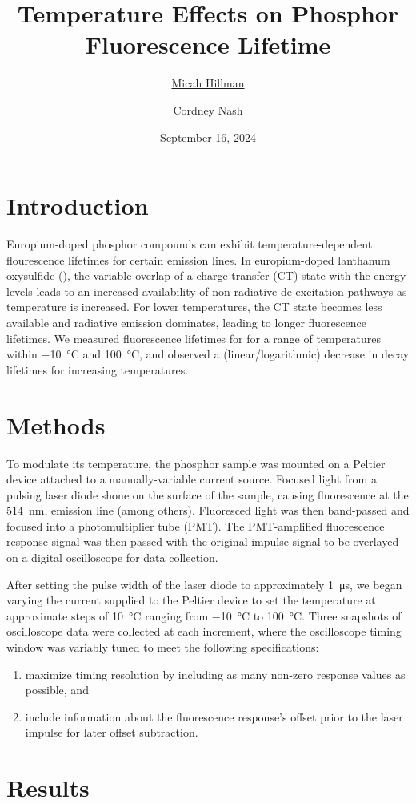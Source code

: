 \documentclass[12pt]{article}
\title{Temperature Effects on Phosphor Fluorescence Lifetime}
\date{September 16, 2024}
\author{\ul{Micah Hillman} \and Cordney Nash}
\begin{document}
  \maketitle

  \section*{Introduction}{
    Europium-doped phosphor compounds can exhibit temperature-dependent flourescence lifetimes for certain emission lines. In europium-doped lanthanum oxysulfide (), the variable overlap of a charge-transfer (CT) state with the  energy levels leads to an increased availability of non-radiative de-excitation pathways as temperature is increased. For lower temperatures, the CT state becomes less available and radiative emission dominates, leading to longer fluorescence lifetimes. We measured fluorescence lifetimes for  for a range of temperatures within \SI{-10}{\degreeCelsius} and \SI{100}{\degreeCelsius}, and observed a (linear/logarithmic) decrease in decay lifetimes for increasing temperatures.
  }

  \section*{Methods}{
    To modulate its temperature, the phosphor sample was mounted on a Peltier device attached to a manually-variable current source. Focused light from a pulsing laser diode shone on the surface of the sample, causing fluorescence at the \SI{514}{\nm},  emission line (among others). Fluoresced light was then band-passed and focused into a photomultiplier tube (PMT). The PMT-amplified fluorescence response signal was then passed with the original impulse signal to be overlayed on a digital oscilloscope for data collection.
    
    After setting the pulse width of the laser diode to approximately \SI{1}{\micro\second}, we began varying the current supplied to the Peltier device to set the temperature at approximate steps of \SI{10}{\degreeCelsius} ranging from \SI{-10}{\degreeCelsius} to \SI{100}{\degreeCelsius}. Three snapshots of oscilloscope data were collected at each increment, where the oscilloscope timing window was variably tuned to meet the following specifications:
      \begin{enumerate}
        \item maximize timing resolution by including as many non-zero response values as possible, and
        \item include information about the fluorescence response's offset prior to the laser impulse for later offset subtraction.
      \end{enumerate}
    
    

  }

  \section*{Results}{
    \lipsum[1]
  }
\end{document}
